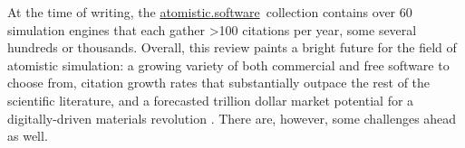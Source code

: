 \documentclass[9pt,review,pubversion]{livecoms}
\newcommand{\atsoft}{\href{https://atomistic.software}{atomistic.software}\ }
\begin{document}

At the time of writing, the \atsoft collection contains over 60 simulation engines that each gather >100 citations per year, some several hundreds or thousands.
Overall, this review paints a bright future for the field of atomistic simulation: 
a growing variety of both commercial and free software to choose from, citation growth rates that substantially outpace the rest of the scientific literature, and a forecasted trillion dollar market potential for a digitally-driven materials revolution \cite{Satell2019}.
There are, however, some challenges ahead as well.
\end{document}
